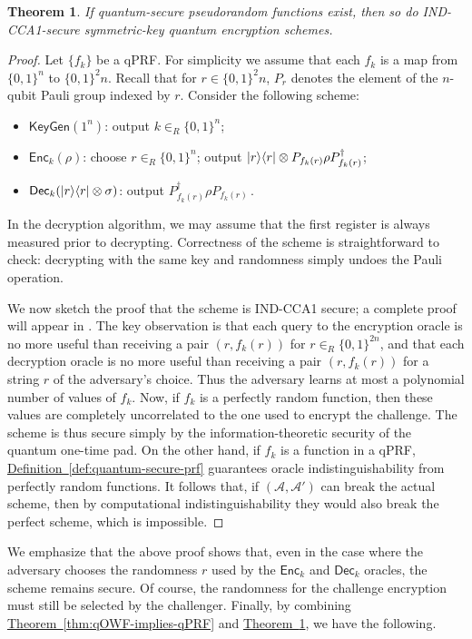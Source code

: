 \documentclass[11pt]{article}
\numberwithin{equation}{section}
\newtheorem{theorem}{Theorem}
\newcommand{\expref}[2]{\texorpdfstring{\hyperref[#2]{#1~\ref{#2}}}{#1~\ref{#2}}}
\newcommand{\algo}{\mathcal}
\newcommand{\KeyGen}{\ensuremath{\mathsf{KeyGen}}\xspace}
\newcommand{\Enc}{\ensuremath{\mathsf{Enc}}\xspace}
\newcommand{\Dec}{\ensuremath{\mathsf{Dec}}\xspace}
\newcommand{\inrand}{\in_R}
\begin{document}
{\begin{theorem}\label{thm:IND-CCA1}
If quantum-secure pseudorandom functions exist, then so do IND-CCA1-secure symmetric-key quantum encryption schemes.
\end{theorem}
\begin{proof}
Let $\{f_k\}$ be a qPRF. For simplicity we assume that each $f_k$ is a map from $\{0, 1\}^n$ to $\{0, 1\}^2n$. Recall that for $r \in \{0, 1\}^2n$, $P_r$ denotes the element of the $n$-qubit Pauli group indexed by $r$. Consider the following scheme:
\begin{itemize}
\item $\KeyGen(1^n)$: output $k \inrand \{0, 1\}^n$;
\item $\Enc_k(\rho)$: choose $r \inrand \{0, 1\}^n$; output ${\left\vert{r}\right\rangle}{\left\langle{r}\right\vert} \otimes P_{f_k(r)} \rho P_{f_k(r)}^{\dagger}$;
\item $\Dec_k(\ket{r}\bra{r} \otimes \sigma)$: output  $P_{f_k(r)}^\dagger \rho P_{f_k(r)}$\,.
\end{itemize}
In the decryption algorithm, we may assume that the first register is always measured prior to decrypting. Correctness of the scheme is straightforward to check: decrypting with the same key and randomness simply undoes the Pauli operation.

We now sketch the proof that the scheme is IND-CCA1 secure; a complete proof will appear in \cite{ABFGSS15}. The key observation is that each query to the encryption oracle is no more useful than receiving a pair $(r, f_k(r))$ for $r \inrand \{0, 1\}^{2n}$, and that each decryption oracle is no more useful than receiving a pair $(r, f_k(r))$ for a string $r$ of the adversary's choice. Thus the adversary learns at most a polynomial number of values of $f_k$. Now, if $f_k$ is a perfectly random function, then these values are completely uncorrelated to the one used to encrypt the challenge. The scheme is thus secure simply by the information-theoretic security of the quantum one-time pad. On the other hand, if $f_k$ is a function in a qPRF, \expref{Definition}{def:quantum-secure-prf} guarantees oracle indistinguishability from perfectly random functions. It follows that, if $(\algo A, \algo A')$ can break the actual scheme, then by computational indistinguishability they would also break the perfect scheme, which is impossible.
\end{proof}

We emphasize that the above proof shows that, even in the case where the adversary chooses the randomness $r$ used by the $\Enc_k$ and $\Dec_k$ oracles, the scheme remains secure. Of course, the randomness for the challenge encryption must still be selected by the challenger. Finally, by combining \expref{Theorem}{thm:qOWF-implies-qPRF} and \expref{Theorem}{thm:IND-CCA1}, we have the following.

}
\end{document}
